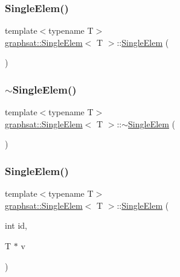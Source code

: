 \subsubsection{\texorpdfstring{SingleElem()}{SingleElem()}\hspace{0.1cm}{\footnotesize\ttfamily [1/2]}}
{\footnotesize\ttfamily template$<$typename T$>$ \\
\mbox{\hyperlink{classgraphsat_1_1_single_elem}{graphsat\+::\+Single\+Elem}}$<$ T $>$\+::\mbox{\hyperlink{classgraphsat_1_1_single_elem}{Single\+Elem}} (\begin{DoxyParamCaption}{ }\end{DoxyParamCaption})\hspace{0.3cm}{\ttfamily [inline]}}

\mbox{\label{classgraphsat_1_1_single_elem_aba919de32596ee734f30eddff78c1480}} 
\subsubsection{\texorpdfstring{$\sim$SingleElem()}{~SingleElem()}}
{\footnotesize\ttfamily template$<$typename T$>$ \\
\mbox{\hyperlink{classgraphsat_1_1_single_elem}{graphsat\+::\+Single\+Elem}}$<$ T $>$\+::$\sim$\mbox{\hyperlink{classgraphsat_1_1_single_elem}{Single\+Elem}} (\begin{DoxyParamCaption}{ }\end{DoxyParamCaption})\hspace{0.3cm}{\ttfamily [inline]}}

\mbox{\label{classgraphsat_1_1_single_elem_a0e17aec3a48dfab80b10242282b3ebb5}} 
\subsubsection{\texorpdfstring{SingleElem()}{SingleElem()}\hspace{0.1cm}{\footnotesize\ttfamily [2/2]}}
{\footnotesize\ttfamily template$<$typename T$>$ \\
\mbox{\hyperlink{classgraphsat_1_1_single_elem}{graphsat\+::\+Single\+Elem}}$<$ T $>$\+::\mbox{\hyperlink{classgraphsat_1_1_single_elem}{Single\+Elem}} (\begin{DoxyParamCaption}\item[{int}]{id,  }\item[{T $\ast$}]{v }\end{DoxyParamCaption})\hspace{0.3cm}{\ttfamily [inline]}}



